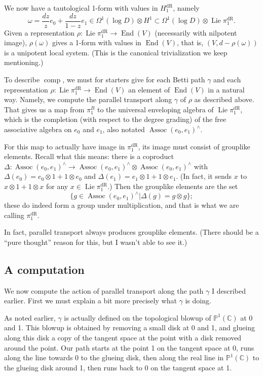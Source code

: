 \documentclass[12pt]{article}
\def\CC{\mathbb{C}}
\def\PP{\mathbb{P}}
\DeclareMathOperator{\Assoc}{Assoc}
\DeclareMathOperator{\comp}{comp}
\DeclareMathOperator{\dR}{dR}
\DeclareMathOperator{\End}{End}
\DeclareMathOperator{\Lie}{Lie}
\begin{document}
We now have a tautological 1-form with values in $H_1^{\dR}$,
namely
\[
\omega = \frac{dz}{z} e_0 + \frac{dz}{1-z} e_1
\in \Omega^1(\log D) \otimes H^1 \subset \Omega^1(\log D)
\otimes \Lie \pi_1^{\dR}.
\]
Given a representation
$\rho: \Lie \pi_1^{\dR} \to \End(V)$ (necessarily with nilpotent
image), $\rho(\omega)$ gives a 1-form with values in $\End(V)$, that is,
$(V, d - \rho(\omega))$ is a unipotent local system. (This is the
canonical trivialization we keep mentioning.)

To describe $\comp$, we must for starters
give for each Betti path $\gamma$ and
each representation $\rho: \Lie \pi_1^{\dR} \to \End(V)$ an
element of $\End(V)$ in a natural way. 
 Namely, we compute the parallel
transport along $\gamma$ of $\rho$ as described above.
That gives us a map 
from $\pi_1^B$ to the universal enveloping algebra of
$\Lie \pi_1^{\dR}$, which is the completion (with respect to the
degree grading) of the free associative algebra on $e_0$ and $e_1$,
also notated $\Assoc(e_0, e_1)^\wedge$.

For this map to actually have image in $\pi_1^{\dR}$, its image
must consist of grouplike elements. Recall what this means: there is
a coproduct $\Delta:
\Assoc(e_0, e_1)^\wedge \to \Assoc(e_0, e_1)^\wedge \otimes
\Assoc(e_0, e_1)^\wedge$ with $\Delta(e_0)=e_0 \otimes 1 + 1 \otimes e_0$
and $\Delta(e_1) = e_1 \otimes 1 + 1 \otimes e_1$. (In fact, it sends
$x$ to $x \otimes 1 + 1 \otimes x$ for any $x \in \Lie \pi_1^{\dR}$.)
Then the grouplike elements are the set
\[
\{g \in \Assoc(e_0, e_1)^\wedge | \Delta(g) = g \otimes g\};
\]
these do indeed form a group under multiplication, and that is what
we are calling $\pi_1^{\dR}$.

In fact, parallel transport always produces grouplike elements. (There should be
a ``pure thought'' reason for this, but I wasn't able to see it.)

\subsection*{A computation}

We now compute the action of parallel transport along
the path $\gamma$ I described
earlier. First we must explain a bit more precisely what $\gamma$ is doing.

As noted earlier, $\gamma$ is actually defined on the topological blowup
of $\PP^1(\CC)$ at 0 and 1. This blowup is obtained by removing a small disk at
0 and 1, and glueing along this disk a copy of the tangent space at the
point with a disk removed around the point. Our path starts at the
point 1 on the tangent space at 0, runs along the line towards 0 to the
glueing disk, then along the real line in $\PP^1(\CC)$ to the glueing disk
around 1, then runs back to 0 on the tangent space at 1.
\end{document}
